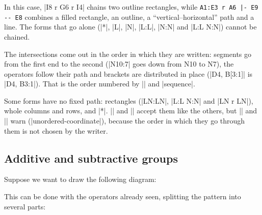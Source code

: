 In this case, |I8 r G6 r I4| chains two outline rectangles, while \verb+A1:E3 r A6 |- E9 -- E8+ combines a filled rectangle, an outline, a ``vertical--horizontal'' path and a line. The forms that go alone (|*|, |L|, |N|, |L:L|, |N:N| and |L:L N:N|) cannot be chained.

\label{subsec:orden-coordenadas}

The intersections come out in the order in which they are written: segments go from the first end to the second (|N10:7| goes down from N10 to N7), the operators follow their path and brackets are distributed in place (|D4, B[3:1]| is |D4, B3:1|). That is the order numbered by |\moves| and |sequence|.

\begin{codeexample}[width=6cm]
	\begin{goban}[7, label = {at = {south, west}}]
	\end{goban}

	\begin{goban}[7, label = {at = {south, west}}]
	\end{goban}
\end{codeexample}

Some forms have no fixed path: rectangles (|LN:LN|, |L:L N:N| and |LN r LN|), whole columns and rows, and |*|. |\stones| and |\marks| accept them like the others, but |\marks[sequence]| and |\moves| warn (|unordered-coordinate|), because the order in which they go through them is not chosen by the writer.

\subsection{Additive and subtractive groups}

Suppose we want to draw the following diagram:

\begin{figure}[H]
	\centering
	\begin{goban}
	\end{goban}
\end{figure}

This can be done with the operators already seen, splitting the pattern into several parts:

\begin{codeexample}[width=6cm]
	\begin{goban}[label = {at = all}]
		\stones[fill = {color = orange}] {A6:B3, B2:E1, D4:E6}
	\end{goban}
\end{codeexample}

